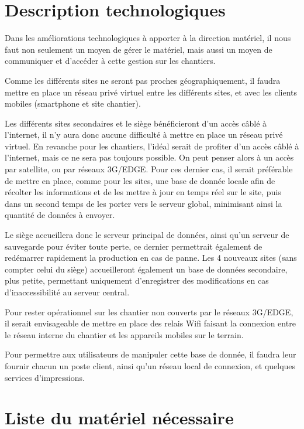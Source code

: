 \section{Description technologiques}

    Dans les améliorations technologiques à apporter à la direction matériel, il nous faut non seulement un moyen de gérer le matériel, mais aussi un moyen de communiquer et d'accéder à cette gestion sur les chantiers.

    Comme les différents sites ne seront pas proches géographiquement, il faudra mettre en place un réseau privé virtuel entre les différents sites, et avec les clients mobiles (smartphone et site chantier).

    Les différents sites secondaires et le siège bénéficieront d'un accès câblé à l'internet, il n'y aura donc aucune difficulté à mettre en place un réseau privé virtuel.
    En revanche pour les chantiers, l'idéal serait de profiter d'un accès câblé à l'internet, mais ce ne sera pas toujours possible. On peut penser alors à un accès par satellite, ou par réseaux 3G/EDGE. Pour ces dernier cas, il serait préférable de mettre en place, comme pour les sites, une base de donnée locale afin de récolter les informations et de les mettre à jour en temps réel sur le site, puis dans un second temps de les porter vers le serveur global, minimisant ainsi la quantité de données à envoyer.

    Le siège accueillera donc le serveur principal de données, ainsi qu'un serveur de sauvegarde pour éviter toute perte, ce dernier permettrait également de redémarrer rapidement la production en cas de panne. Les 4 nouveaux sites (sans compter celui du siège) accueilleront également un base de données secondaire, plus petite, permettant uniquement d'enregistrer des modifications en cas d'inaccessibilité au serveur central.

    Pour rester opérationnel sur les chantier non couverts par le réseaux 3G/EDGE, il serait envisageable de mettre en place des relais Wifi faisant la connexion entre le réseau interne du chantier et les appareils mobiles sur le terrain.

    Pour permettre aux utilisateurs de manipuler cette base de donnée, il faudra leur fournir chacun un poste client, ainsi qu'un réseau local de connexion, et quelques services d'impressions.


\section{Liste du matériel nécessaire}
